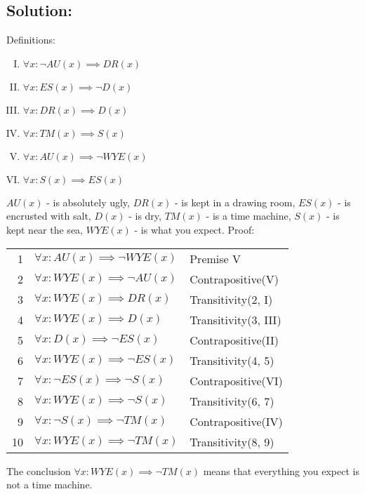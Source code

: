 \documentclass[12pt]{article}
\begin{document}
\subsection*{\textbf{Solution:}}
Definitions:
\begin{enumerate}[I.]
    \item $\forall x: \neg AU(x) \implies DR(x)$

    \item $\forall x: ES(x) \implies \neg D(x)$

    \item $\forall x: DR(x) \implies D(x)$

    \item $\forall x: TM(x) \implies S(x)$

    \item $\forall x: AU(x) \implies \neg WYE(x)$

    \item $\forall x: S(x) \implies ES(x)$
\end{enumerate}
$AU(x)$ - is absolutely ugly, $DR(x)$ - is kept in a drawing room, $ES(x)$ - is encrusted with salt, $D(x)$ - is dry, $TM(x)$ - is a time machine, $S(x)$ - is kept near the sea, $WYE(x)$ - is what you expect.
\newpage
Proof:
\begin{center}
\begin{tabular}{r | l l}
1 & $\forall x: AU(x) \implies \neg WYE(x)$ & Premise V\\
2 & $\forall x: WYE(x) \implies \neg AU(x)$ & Contrapositive(V)\\
3 & $\forall x: WYE(x) \implies DR(x)$ & Transitivity(2, I)\\
4 & $\forall x: WYE(x) \implies D(x)$ & Transitivity(3, III)\\
5 & $\forall x: D(x) \implies \neg ES(x)$ & Contrapositive(II)\\
6 & $\forall x: WYE(x) \implies \neg ES(x)$ & Transitivity(4, 5)\\
7 & $\forall x: \neg ES(x) \implies \neg S(x)$ & Contrapositive(VI)\\
8 & $\forall x: WYE(x) \implies \neg S(x)$ & Transitivity(6, 7)\\
9 & $\forall x: \neg S(x) \implies \neg TM(x)$ & Contrapositive(IV)\\
10 & $\forall x: WYE(x) \implies \neg TM(x)$ & Transitivity(8, 9)
\end{tabular}
\end{center}
The conclusion $\forall x: WYE(x) \implies \neg TM(x)$ means that everything you expect is not a time machine.
\end{document}
